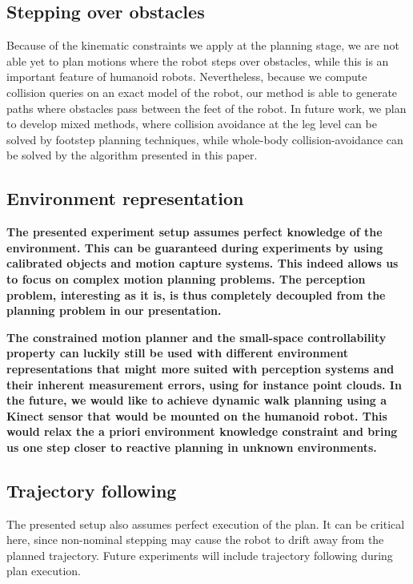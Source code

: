\documentclass{article}
\begin{document}
\subsection{Stepping over obstacles}

Because of the kinematic constraints we apply at the planning stage, we are not
able yet to plan motions where the robot steps over obstacles, while this is an 
important feature of humanoid robots. Nevertheless, because we compute collision queries on
an exact model of the robot, our method is able to generate paths where obstacles
pass between the feet of the robot.
In future work, we plan to develop mixed
methods, where collision avoidance at the leg level can be solved by footstep
planning techniques, while whole-body collision-avoidance can be solved by the
algorithm presented in this paper.

\subsection{Environment representation}

\textbf{The presented experiment setup assumes perfect knowledge of
  the environment. This can be guaranteed during experiments by using
  calibrated objects and motion capture systems. This indeed allows us
  to focus on complex motion planning problems. The perception
  problem, interesting as it is, is thus completely decoupled from the
  planning problem in our presentation.}

\textbf{The constrained motion planner and the small-space
  controllability property can luckily still be used with different
  environment representations that might more suited with perception
  systems and their inherent measurement errors, using for instance
  point clouds. In the future, we would like to achieve dynamic walk
  planning using a Kinect sensor that would be mounted on the humanoid
  robot. This would relax the a priori environment knowledge
  constraint and bring us one step closer to reactive planning in
  unknown environments.}

\subsection{Trajectory following}

The presented setup also assumes perfect execution of the plan. It can
be critical here, since non-nominal stepping may cause the robot to
drift away from the planned trajectory. Future experiments will
include trajectory following during plan execution.
\end{document}
